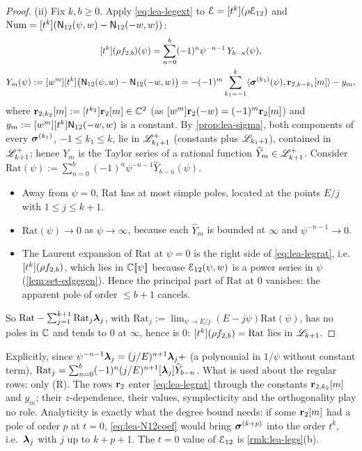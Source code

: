 \begin{proof}
(ii) Fix $k,b\geq 0$. Apply \eqref{eq:lea-legext} to $\mathcal{E} = [t^k](\rho\mathcal{E}_{12})$ and $\mathrm{Num} = [t^k](\mathsf{N}_{12}(\psi,w) - \mathsf{N}_{12}(-w,w))$:
\begin{equation}
\label{eq:lea-legrat}
\begin{gathered}
\coef{t^k}(\rho f_{2,b})(\psi) = \sum_{n=0}^{b}(-1)^n\psi^{-n-1}\,Y_{b-n}(\psi),\\
Y_m(\psi) := \coef{w^m}\coef{t^k}\bigl(\leaNtw(\psi,w) - \leaNtw(-w,w)\bigr) = -(-1)^m\sum_{k_1=-1}^{k}\langle\brow^{(k_1)}(\psi),\vv_{2,k-k_1}[m]\rangle - y_m,
\end{gathered}
\end{equation}
where $\mathbf{r}_{2,k_2}[m] := [t^{k_2}]\mathbf{r}_2[m]\in\mathbb{C}^2$ (as $[w^m]\mathbf{r}_2(-w) = (-1)^m\mathbf{r}_2[m]$) and $y_m := [w^m][t^k]\mathsf{N}_{12}(-w,w)$ is a constant. By \cref{prop:lea-sigma}, both components of every $\boldsymbol{\sigma}^{(k_1)}$, $-1\leq k_1\leq k$, lie in $\mathscr{L}_{k_1+1}^{+}$ (constants plus $\mathscr{L}_{k_1+1}$), contained in $\mathscr{L}_{k+1}^{+}$; hence $Y_m$ is the Taylor series of a rational function $\widehat{Y}_m\in\mathscr{L}_{k+1}^{+}$. Consider $\mathrm{Rat}(\psi) := \sum_{n=0}^{b}(-1)^n\psi^{-n-1}\widehat{Y}_{b-n}(\psi)$.
\begin{itemize}
\item[(a)] Away from $\psi = 0$, $\mathrm{Rat}$ has at most simple poles, located at the points $E/j$ with $1\leq j\leq k+1$.
\item[(b)] $\mathrm{Rat}(\psi)\to 0$ as $\psi\to\infty$, because each $\widehat{Y}_m$ is bounded at $\infty$ and $\psi^{-n-1}\to 0$.
\item[(c)] The Laurent expansion of $\mathrm{Rat}$ at $\psi = 0$ is the right side of \eqref{eq:lea-legrat}, i.e.\ $[t^k](\rho f_{2,b})$, which lies in $\mathbb{C}[\![ \psi ]\!]$ because $\mathcal{E}_{12}(\psi,w)$ is a power series in $\psi$ (\cref{lem:set-edgegen}). Hence the principal part of $\mathrm{Rat}$ at $0$ vanishes: the apparent pole of order $\leq b+1$ cancels.
\end{itemize}
So $\mathrm{Rat} - \sum_{j=1}^{k+1}\mathrm{Rat}_j\boldsymbol{\lambda}_j$, with $\mathrm{Rat}_j := \lim_{\psi\to E/j}(E-j\psi)\mathrm{Rat}(\psi)$, has no poles in $\mathbb{C}$ and tends to $0$ at $\infty$, hence is $0$: $[t^k](\rho f_{2,b}) = \mathrm{Rat}$ lies in $\mathscr{L}_{k+1}$.
\end{proof}

Explicitly, since $\psi^{-n-1}\boldsymbol{\lambda}_j = (j/E)^{n+1}\boldsymbol{\lambda}_j + $ (a polynomial in $1/\psi$ without constant term), $\mathrm{Rat}_j = \sum_{n=0}^{b}(-1)^n(j/E)^{n+1}[\boldsymbol{\lambda}_j]\widehat{Y}_{b-n}$. What is used about the regular rows: only (R). The rows $\mathbf{r}_2$ enter \eqref{eq:lea-legrat} through the constants $\mathbf{r}_{2,k_2}[m]$ and $y_m$; their $z$-dependence, their values, symplecticity and the orthogonality play no role. Analyticity is exactly what the degree bound needs: if some $\mathbf{r}_2[m]$ had a pole of order $p$ at $t = 0$, \eqref{eq:lea-N12coef} would bring $\boldsymbol{\sigma}^{(k+p)}$ into the order $t^k$, i.e.\ $\boldsymbol{\lambda}_j$ with $j$ up to $k+p+1$. The $t = 0$ value of $\mathcal{E}_{12}$ is \cref{rmk:lea-legs}(b).

